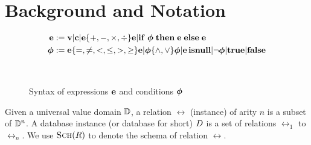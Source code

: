
\section{Background and Notation}
\label{sec:background}


\begin{figure}[t]
\centering
\begin{minipage}{1.0\linewidth}
\begin{align*}
\bf{e}                                & := \bf{v} | c | \bf{e} \lbrace +,-,\times,\div\rbrace \bf{e} | \mathbf{if}\thickspace \boldsymbol{\phi} \thickspace \mathbf{then} \thickspace \bf{e} \thickspace \mathbf{else} \thickspace \bf{e} \\
\boldsymbol{\phi}                                & := \bf{e} \lbrace =,\neq,<,\leq,>,\geq \rbrace \bf{e} | \boldsymbol{\phi} \lbrace \wedge ,\vee \rbrace \boldsymbol{\phi} | \bf{e} \,\mathbf{isnull} | \neg \boldsymbol{\phi} | \mathbf{true} | \mathbf{false}
\end{align*}
\end{minipage}\\[-5mm]
\caption{Syntax of expressions $\bf{e}$ and conditions $\boldsymbol{\phi}$}
  \label{fig:expr-grammar}
\end{figure}

Given a universal value domain $\mathbb{D}$, a relation $\rel$ (instance) of 
arity $n$ is a subset of $\mathbb{D}^{n}$. A database instance (or database for short) $D$ 
is a set of relations $\rel_1$ to $\rel_n$. We use $\textsc{Sch}(R)$ to denote the schema of relation $\rel$.

